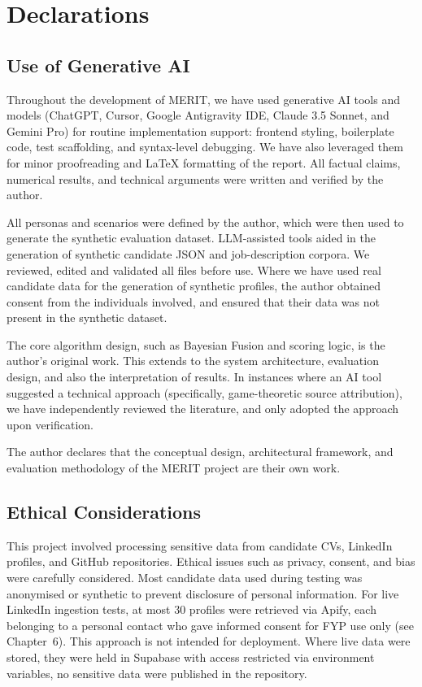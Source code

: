 \chapter{Declarations}
\label{appendix:declarations}

\section{Use of Generative AI}

Throughout the development of MERIT, we have used generative AI tools and models (ChatGPT, Cursor, Google Antigravity IDE, Claude 3.5 Sonnet, and Gemini Pro)
for routine implementation support: frontend styling, boilerplate code, test scaffolding, and syntax-level
debugging. We have also leveraged them for minor proofreading and \LaTeX{} formatting of the report. All factual
claims, numerical results, and technical arguments were written and verified by the author.

All personas and scenarios were defined by the author, which were then used to generate the synthetic evaluation dataset.
LLM-assisted tools aided in the generation of synthetic candidate JSON and job-description corpora. We reviewed,
edited and validated all files before use. Where we have used real candidate data for the generation of synthetic profiles,
the author obtained consent from the individuals involved, and ensured that their data was not present in the synthetic dataset.

The core algorithm design, such as Bayesian Fusion and scoring logic, is the author's original work. This extends to the 
system architecture, evaluation design, and also the interpretation of results. In instances where an AI tool suggested a 
technical approach (specifically, game-theoretic source attribution), we have independently reviewed the 
literature, and only adopted the approach upon verification.

The author declares that the conceptual design, architectural framework, and evaluation methodology of 
the MERIT project are their own work.

\section{Ethical Considerations}

This project involved processing sensitive data from candidate CVs, LinkedIn profiles, and GitHub repositories. 
Ethical issues such as privacy, consent, and bias were carefully considered. 
Most candidate data used during testing was anonymised or synthetic to prevent disclosure of personal information.
For live LinkedIn ingestion tests, at most 30 profiles were retrieved via Apify, each belonging to a personal contact 
who gave informed consent for FYP use only (see Chapter~6). This approach is not intended for deployment.
Where live data were stored, they were held in Supabase with access restricted via environment variables, no sensitive 
data were published in the repository.

